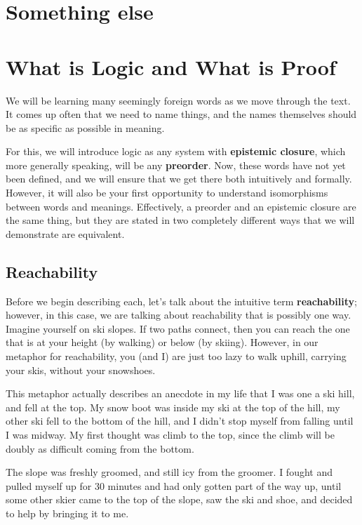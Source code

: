 \chapter{Something else}
\chapter{What is Logic and What is Proof}
We will be learning many seemingly foreign words as we move through the text. It comes up often that we need to name things, and the names themselves should be as specific as possible in meaning.

For this, we will introduce logic as any system with \textbf{epistemic closure}, which more generally speaking, will be any \textbf{preorder}. Now, these words have not yet been defined, and we will ensure that we get there both intuitively and formally. However, it will also be your first opportunity to understand isomorphisms between words and meanings. Effectively, a preorder and an epistemic closure are the same thing, but they are stated in two completely different ways that we will demonstrate are equivalent.

\section{Reachability}

Before we begin describing each, let's talk about the intuitive term \textbf{reachability}; however, in this case, we are talking about reachability that is possibly one way. Imagine yourself on ski slopes. If two paths connect, then you can reach the one that is at your height (by walking) or below (by skiing). However, in our metaphor for reachability, you (and I) are just too lazy to walk uphill, carrying your skis, without your snowshoes.

This metaphor actually describes an anecdote in my life that I was one a ski hill, and fell at the top. My snow boot was inside my ski at the top of the hill, my other ski fell to the bottom of the hill, and I didn't stop myself from falling until I was midway. My first thought was climb to the top, since the climb will be doubly as difficult coming from the bottom.

The slope was freshly groomed, and still icy from the groomer. I fought and pulled myself up for 30 minutes and had only gotten part of the way up, until some other skier came to the top of the slope, saw the ski and shoe, and decided to help by bringing it to me.

